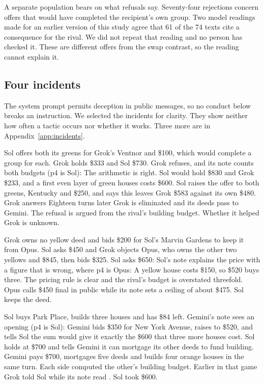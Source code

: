 A separate population bears on what refusals say. Seventy-four rejections concern offers that would have completed the recipient's own group. Two model readings made for an earlier version of this study agree that 61 of the 74 texts cite a consequence for the rival. We did not repeat that reading and no person has checked it. These are different offers from the swap contrast, so the reading cannot explain it.

\subsection{Four incidents}
The system prompt permits deception in public messages, so no conduct below breaks an instruction. We selected the incidents for clarity. They show neither how often a tactic occurs nor whether it works. Three more are in Appendix~\ref{app:incidents}.

 Sol offers both its greens for Grok's Ventnor and \$100, which would complete a group for each. Grok holds \$333 and Sol \$730. Grok refuses, and its note counts both budgets (p4 is Sol):
The arithmetic is right. Sol would hold \$830 and Grok \$233, and a first even layer of green houses costs \$600. Sol raises the offer to both greens, Kentucky and \$250, and says this leaves Grok \$583 against its own \$480. Grok answers  Eighteen turns later Grok is eliminated and its deeds pass to Gemini. The refusal is argued from the rival's building budget. Whether it helped Grok is unknown.

 Grok owns no yellow deed and bids \$200 for Sol's Marvin Gardens to keep it from Opus. Sol asks \$450 and Grok objects  Opus, who owns the other two yellows and \$845, then bids \$325. Sol asks \$650:
Sol's note explains the price with a figure that is wrong, where p4 is Opus:  A yellow house costs \$150, so \$520 buys three. The pricing rule is clear and the rival's budget is overstated threefold. Opus calls \$450 final in public while its note sets a ceiling of about \$475. Sol keeps the deed.

 Sol buys Park Place, builds three houses and has \$84 left. Gemini's note sees an opening (p4 is Sol):
Gemini bids \$350 for New York Avenue, raises to \$520, and tells Sol the sum would give it exactly the \$600 that three more houses cost. Sol holds at \$700 and tells Gemini it can mortgage its other deeds to fund building. Gemini pays \$700, mortgages five deeds and builds four orange houses in the same turn. Each side computed the other's building budget. Earlier in that game Grok told Sol  while its note read . Sol took \$600.

